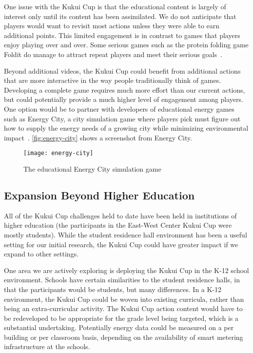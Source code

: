One issue with the Kukui Cup is that the educational content is largely of interest only until its content has been assimilated. We do not anticipate that players would want to revisit most actions unless they were able to earn additional points. This limited engagement is in contrast to games that players enjoy playing over and over. Some serious games such as the protein folding game Foldit do manage to attract repeat players and meet their serious goals~\cite{Khatib2011}.

Beyond additional videos, the Kukui Cup could benefit from additional actions that are more interactive in the way people traditionally think of games. Developing a complete game requires much more effort than our current actions, but could potentially provide a much higher level of engagement among players. One option would be to partner with developers of educational energy games such as Energy City, a city simulation game where players pick must figure out how to supply the energy needs of a growing city while minimizing environmental impact~\cite{energy-city}. \autoref{fig:energy-city} shows a screenshot from Energy City.

\begin{figure}[htbp]
	\centering
	\texttt{[image: energy-city]}
	\caption{The educational Energy City simulation game}
	\label{fig:energy-city}
\end{figure}


\subsection{Expansion Beyond Higher Education}

All of the Kukui Cup challenges held to date have been held in institutions of higher education (the participants in the East-West Center Kukui Cup were mostly students). While the student residence hall environment has been a useful setting for our initial research, the Kukui Cup could have greater impact if we expand to other settings.

One area we are actively exploring is deploying the Kukui Cup in the K-12 school environment. Schools have certain similarities to the student residence halls, in that the participants would be students, but many differences. In a K-12 environment, the Kukui Cup could be woven into existing curricula, rather than being an extra-curricular activity. The Kukui Cup action content would have to be redeveloped to be appropriate for the grade level being targeted, which is a substantial undertaking. Potentially energy data could be measured on a per building or per classroom basis, depending on the availability of smart metering infrastructure at the schools.

